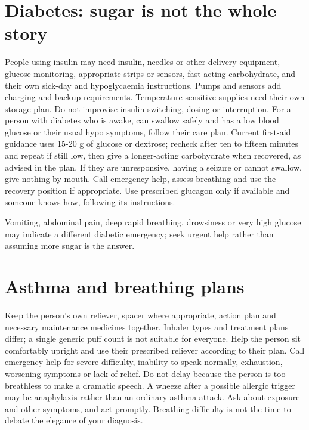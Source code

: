 \documentclass[10pt,openright]{book}
\begin{document}
\section*{Diabetes: sugar is not the whole story}
People using insulin may need insulin, needles or other delivery equipment, glucose monitoring, appropriate strips or sensors, fast-acting carbohydrate, and their own sick-day and hypoglycaemia instructions. Pumps and sensors add charging and backup requirements. Temperature-sensitive supplies need their own storage plan. Do not improvise insulin switching, dosing or interruption. For a person with diabetes who is awake, can swallow safely and has a low blood glucose or their usual hypo symptoms, follow their care plan. Current first-aid guidance uses 15-20 g of glucose or dextrose; recheck after ten to fifteen minutes and repeat if still low, then give a longer-acting carbohydrate when recovered, as advised in the plan. If they are unresponsive, having a seizure or cannot swallow, give nothing by mouth. Call emergency help, assess breathing and use the recovery position if appropriate. Use prescribed glucagon only if available and someone knows how, following its instructions.

Vomiting, abdominal pain, deep rapid breathing, drowsiness or very high glucose may indicate a different diabetic emergency; seek urgent help rather than assuming more sugar is the answer.

\section*{Asthma and breathing plans}
Keep the person's own reliever, spacer where appropriate, action plan and necessary maintenance medicines together. Inhaler types and treatment plans differ; a single generic puff count is not suitable for everyone. Help the person sit comfortably upright and use their prescribed reliever according to their plan. Call emergency help for severe difficulty, inability to speak normally, exhaustion, worsening symptoms or lack of relief. Do not delay because the person is too breathless to make a dramatic speech. A wheeze after a possible allergic trigger may be anaphylaxis rather than an ordinary asthma attack. Ask about exposure and other symptoms, and act promptly. Breathing difficulty is not the time to debate the elegance of your diagnosis.
\end{document}

